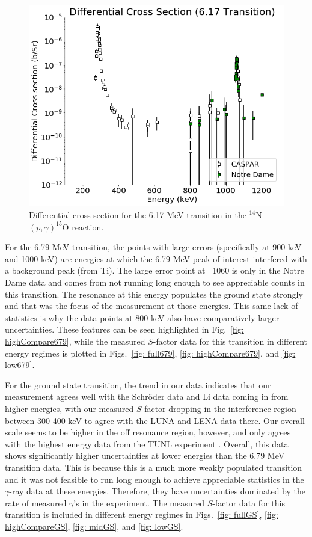 \begin{figure}
		\includegraphics[width=1.0\linewidth]{figures/cs617.png}
	\caption{Differential cross section for the 6.17 MeV transition in the $^{14}$N$\left( p,\gamma \right) ^{15}$O reaction. }
	\label{fig: cs617}
\end{figure}


For the 6.79 MeV transition, the points with large errors (specifically at 900 keV and 1000 keV) are energies at which the 6.79 MeV peak of interest interfered with a background peak (from Ti). The large error point at ~1060 is only in the Notre Dame data and comes from not running long enough to see appreciable counts in this transition. The resonance at this energy populates the ground state strongly and that was the focus of the measurement at those energies. This same lack of statistics is why the data points at 800 keV also have comparatively larger uncertainties. These features can be seen highlighted in Fig.\ \ref{fig: highCompare679}, while the measured $S$-factor data for this transition in different energy regimes is plotted in Figs.\ \ref{fig: full679}, \ref{fig: highCompare679}, and \ref{fig: low679}.

For the ground state transition, the trend in our data indicates that our
measurement agrees well with the Schr{\"o}der data \cite{Schroder1987} and Li data \cite{Li2016} coming in from higher energies, with our measured $S$-factor dropping in the interference region between 300-400 keV to agree with the LUNA \cite{Imbriani2005} and LENA \cite{Runkle2005} data there. Our overall scale seems to be higher in the off resonance region, however, and only agrees with the highest energy data from the TUNL experiment \cite{Runkle2005}. Overall, this data shows significantly higher uncertainties at lower energies than the 6.79 MeV transition data. This is because this is a much more weakly populated transition and it was not feasible to run long enough to achieve appreciable statistics in the $\gamma$-ray data at these energies. Therefore, they have uncertainties dominated by the rate of measured $\gamma$'s in the experiment. The measured $S$-factor data for this transition is included in different energy regimes in Figs.\ \ref{fig: fullGS}, \ref{fig: highCompareGS}, \ref{fig: midGS}, and \ref{fig: lowGS}.


